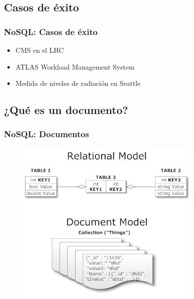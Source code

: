 \documentclass[serif,12pt]{beamer}
\begin{document}
\subsection{Casos de éxito}
\begin{frame}
\frametitle{NoSQL: Casos de éxito}

\begin{itemize}
\item CMS en el LHC
\item ATLAS Workload Management System
\item Medida de niveles de radiación en Seattle
\end{itemize}


\end{frame}

\subsection{¿Qué es un documento?}
\begin{frame}
\frametitle{NoSQL: Documentos}

\begin{figure}
\centering
\includegraphics[width=0.8\textwidth, height=0.8\textheight]{images/document_vs_tables.png} 
\label{fig:data_rates}
\end{figure}

\end{frame}

\end{document}
